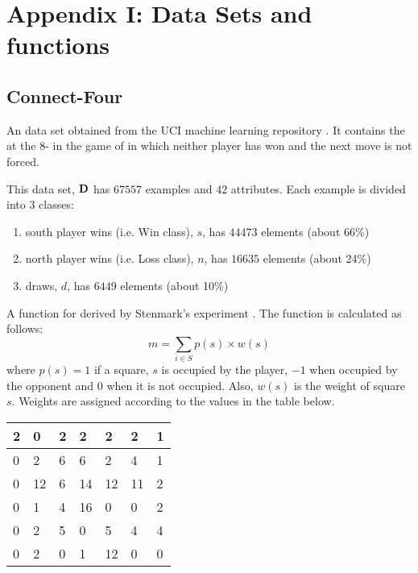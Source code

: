 \chapter*{Appendix I: Data Sets and functions}

\section{Connect-Four}
\label{sec:uci-c4}
 {An data set obtained from the UCI machine learning repository \cite{bache:uci}. It contains the  at the 8- in the game of  in which neither player has won and the next move is not forced.}

This data set, ${\bf D}$ has $67557$ examples and $42$ attributes.  Each example is divided into $3$ classes:
\begin{enumerate}
	\item south player wins (i.e. Win class), $s$, has $44473$ elements (about 66\%)
	\item north player wins (i.e. Loss class), $n$, has $16635$ elements (about 24\%)
	\item draws, $d$, has $6449$ elements (about 10\%)
\end{enumerate}

 {A function for   derived by Stenmark's experiment \cite{stenmark:masters}. The function is calculated as follows:
\[ 
m = \sum_{i \in S}{p(s) \times w(s)}
\] 
where $p(s) = 1$ if a square, $s$ is occupied by the player, $-1$ when occupied by the opponent and $0$ when it is not occupied.  Also, $w(s)$ is the weight of square $s$. Weights are assigned according to the values in the table below. 
\newline
\begin{center}
\begin{tabular} {|l|l|l|l|l|l|l|}
	\hline
	2& 0&2& 2& 2& 2&1 \\ \hline
	0& 2&6& 6& 2& 4&1 \\ \hline
	0&12&6&14&12&11&2 \\  \hline
	0& 1&4&16& 0& 0&2 \\ \hline
	0& 2&5& 0& 5& 4&4 \\ \hline
	0& 2&0& 1& 12&0&0 \\ \hline
\end{tabular}
\end{center}
} 

